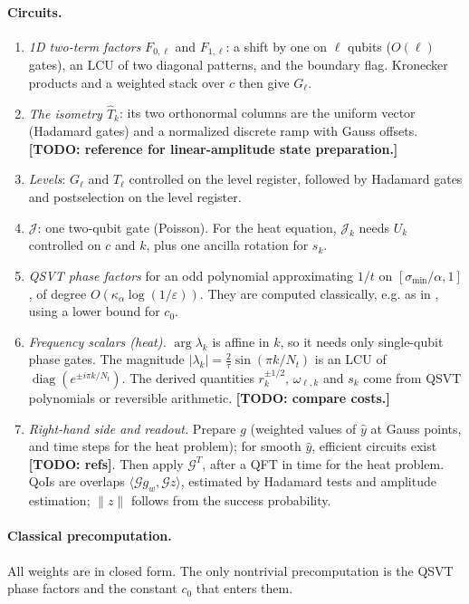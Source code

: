 \documentclass[11pt,a4paper]{article}
\newcommand{\G}{\mathcal{G}}
\newcommand{\J}{\mathcal{J}}
\newcommand{\todo}[1]{\textbf{[TODO: #1]}}
\theoremstyle{remark}
\begin{document}
\paragraph{Circuits.}
\begin{enumerate}
\item \emph{1D two-term factors} $F_{0,\ell}$ and $F_{1,\ell}$: a shift by one on $\ell$
  qubits ($O(\ell)$ gates), an LCU of two diagonal patterns, and the boundary
  flag. Kronecker products and a weighted stack over $c$ then give $G_\ell$.
\item \emph{The isometry $\widehat T_k$}: its two orthonormal columns are the
  uniform vector (Hadamard gates) and a normalized discrete ramp with
  Gauss offsets. \todo{reference for linear-amplitude state preparation.}
\item \emph{Levels}: $G_\ell$ and $T_\ell$ controlled on the level register,
  followed by Hadamard gates and postselection on the level register.
\item \emph{$\J$}: one two-qubit gate (Poisson). For the heat equation,
  $\J_k$ needs $U_k$ controlled on $c$ and $k$, plus one ancilla rotation for
  $s_k$.
\item \emph{QSVT phase factors} for an odd polynomial approximating $1/t$
  on $[\sigma_{\min}/\alpha,1]$, of degree $O(\kappa_\alpha\log(1/\varepsilon))$. They are
  computed classically, e.g. as in \cite{DMWL21}, using a lower bound for
  $c_0$.
\item \emph{Frequency scalars (heat).} $\arg\lambda_k$ is affine in $k$, so it
  needs only single-qubit phase gates. The magnitude
  $|\lambda_k|=\frac2\tau\sin(\pi k/N_t)$ is an LCU of $\operatorname{diag}(e^{\pm i\pi k/N_t})$. The
  derived quantities $r_k^{\pm1/2}$, $\omega_{\ell,k}$ and $s_k$ come from QSVT
  polynomials or reversible arithmetic. \todo{compare costs.}
\item \emph{Right-hand side and readout.} Prepare $g$ (weighted values of
  $\hat y$ at Gauss points, and time steps for the heat problem); for smooth
  $\hat y$, efficient circuits exist \todo{refs}. Then apply $\G^T$, after a QFT
  in time for the heat problem. QoIs are overlaps $\langle\G g_w,\G z\rangle$,
  estimated by Hadamard tests and amplitude estimation; $\|z\|$ follows from
  the success probability.
\end{enumerate}

\paragraph{Classical precomputation.} All weights are in closed form. The
only nontrivial precomputation is the QSVT phase factors and the constant
$c_0$ that enters them.
\end{document}
